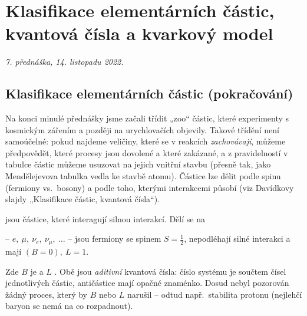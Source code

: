 \section{Klasifikace elementárních částic, kvantová čísla a kvarkový model}

\emph{7. přednáška, 14. listopadu 2022.}

\subsection{Klasifikace elementárních částic (pokračování)}

Na konci minulé přednášky jsme začali třídit „zoo“ částic, které experimenty
s kosmickým zářením a později na urychlovačích objevily. Takové třídění není
samoúčelné: pokud najdeme veličiny, které se v reakcích \emph{zachovávají},
můžeme předpovědět, které procesy jsou dovolené a které zakázané, a
z pravidelností v tabulce částic můžeme usuzovat na jejich vnitřní stavbu
(přesně tak, jako Mendělejevova tabulka vedla ke stavbě atomu). Částice lze
dělit podle spinu (fermiony vs.\ bosony) a podle toho, kterými interakcemi
působí (viz Davídkovy slajdy „Klasifikace částic, kvantová čísla“).

\begin{definice}
 jsou částice, které interagují silnou interakcí. Dělí se na
\begin{center}
\end{center}
 -- \(e,\ \mu,\ \nu_e,\ \nu_\mu,\ \dots\) -- jsou fermiony se
spinem \(S=\tfrac12\), nepodléhají silné interakci a mají \((B=0),\ L=1\).
\end{definice}

Zde \(B\) je  a \(L\) . Obě jsou
\emph{aditivní} kvantová čísla: číslo systému je součtem čísel jednotlivých
částic, antičástice mají opačné znaménko. Dosud nebyl pozorován žádný proces,
který by \(B\) nebo \(L\) narušil -- odtud např.\ stabilita protonu (nejlehčí
baryon se nemá na co rozpadnout).

